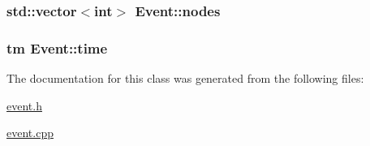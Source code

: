 \hypertarget{classEvent_a2b330c8081c3c907a02daa7da8043fc6}{
\subsubsection[{nodes}]{\setlength{\rightskip}{0pt plus 5cm}std\-::vector$<$int$>$ {\bf \-Event\-::nodes}}}\label{classEvent_a2b330c8081c3c907a02daa7da8043fc6}
\hypertarget{classEvent_a91d5938dce4b4328e35f5626c22ec844}{
\subsubsection[{time}]{\setlength{\rightskip}{0pt plus 5cm}tm {\bf \-Event\-::time}}}\label{classEvent_a91d5938dce4b4328e35f5626c22ec844}


\-The documentation for this class was generated from the following files\-:\begin{DoxyCompactItemize}
\item 
\hyperlink{event_8h}{event.\-h}\item 
\hyperlink{event_8cpp}{event.\-cpp}\end{DoxyCompactItemize}
